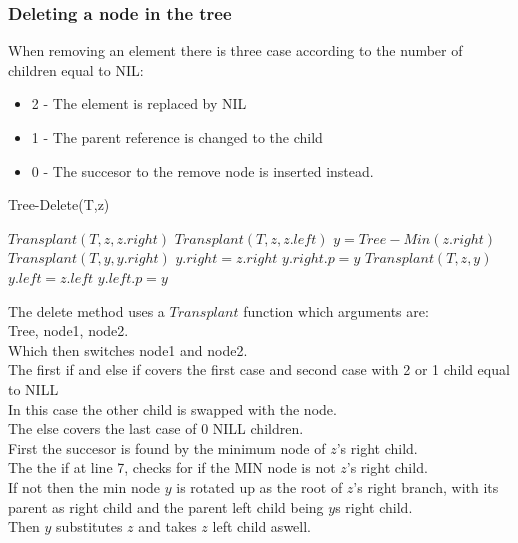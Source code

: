 \documentclass[12pt, a4paper]{article}
\begin{document}
				\subsubsection{Deleting a node in the tree}
				When removing an element there is three case according to the number of children equal to NIL:
						\begin{itemize}
							\item 2 - The element is replaced by NIL
							\item 1 - The parent reference is changed to the child
							\item 0 - The succesor to the remove node is inserted instead.
						\end{itemize}
					\begin{minipage}{0.49\textwidth}
						Tree-Delete(T,z)
						\begin{algorithmic}[1]
								\State $Transplant(T,z,z.right)$
								\State $Transplant(T,z,z.left)$
							\Else
								\State $y=Tree-Min(z.right)$
									\State $Transplant(T,y,y.right)$
									\State $y.right = z.right$
									\State $y.right.p = y$
								\EndIf
								\State $Transplant(T,z,y)$
								\State $y.left = z.left$
								\State $y.left.p = y$
							\EndIf
						\end{algorithmic}
					\end{minipage}
					\begin{minipage}{0.49\textwidth}
						The delete method uses a $Transplant$ function which arguments are:\\
						 Tree, node1, node2. \\
						Which then switches node1 and node2.\\
						The first if and else if covers the first case and second case with 2 or 1 child equal to NILL\\
						In this case the other child is swapped with the node.\\[4mm]
						The else covers the last case of 0 NILL children.\\
						First the succesor is found by the minimum node of $z$'s right child.\\
						The the if at line 7, checks for if the MIN node is not $z$'s right child.\\
						 If not then the min node $y$ is rotated up as the root of $z$'s right branch, with its parent as right child and the parent left child being $y$s right child.\\
						 Then $y$ substitutes $z$ and takes $z$ left child aswell.\\
						 
					\end{minipage}
				
\end{document}
